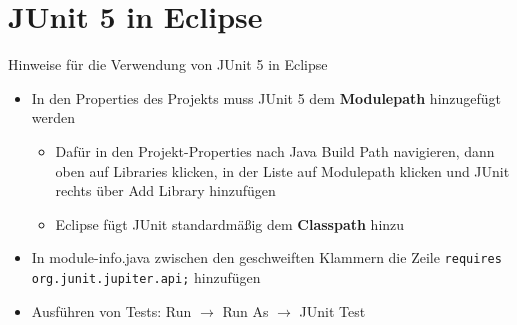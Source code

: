 \documentclass[utf8,t,aspectratio=169]{beamer}
\begin{document}
  \section{JUnit 5 in Eclipse}
    \begin{frame}[fragile]{Hinweise für die Verwendung von JUnit 5 in Eclipse}
      \begin{itemize}
        \item In den Properties des Projekts muss JUnit 5 dem \textbf{Modulepath} hinzugefügt werden
          \begin{itemize}
            \item Dafür in den Projekt-Properties nach \glqq{}Java Build Path\grqq{} navigieren, dann oben auf \glqq{}Libraries\grqq{} klicken, in der Liste auf \glqq{}Modulepath\grqq{} klicken und JUnit rechts über \glqq{}Add Library\grqq{} hinzufügen
            \item Eclipse fügt JUnit standardmäßig dem \textbf{Classpath} hinzu
          \end{itemize}
        \item In module-info.java zwischen den geschweiften Klammern die Zeile \lstinline{requires org.junit.jupiter.api;} hinzufügen
        \item Ausführen von Tests: Run $\rightarrow$ Run As $\rightarrow$ JUnit Test
      \end{itemize}
    \end{frame}
\end{document}

